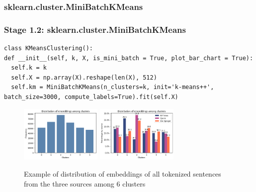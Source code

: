 \documentclass{tum-presentation}
\begin{document}
\subsubsection{sklearn.cluster.MiniBatchKMeans}
\begin{frame}[fragile]
  \frametitle{Stage 1.2: sklearn.cluster.MiniBatchKMeans}
  \begin{lstlisting}
class KMeansClustering():
def __init__(self, k, X, is_mini_batch = True, plot_bar_chart = True):
  self.k = k
  self.X = np.array(X).reshape(len(X), 512)
  self.km = MiniBatchKMeans(n_clusters=k, init='k-means++', batch_size=3000, compute_labels=True).fit(self.X)
  \end{lstlisting}
  \begin{center}
    \begin{figure}[t]
      \includegraphics[width=0.35\textwidth]{images/6ks-overall-bar.png}
      \hspace{2cm}
      \includegraphics[width=0.35\textwidth]{images/6ks-grouped-bar.png}
      \caption{Example of distribution of embeddings of all tokenized sentences from the three sources among 6 clusters}
    \end{figure}
  \end{center}
\end{frame}
\end{document}
